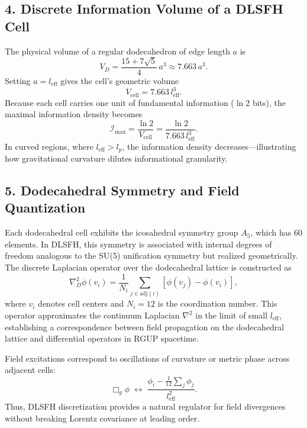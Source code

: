 \documentclass[11pt,oneside]{book}
\numberwithin{equation}{chapter}
\begin{document}
\subsection*{4. Discrete Information Volume of a DLSFH Cell}

The physical volume of a regular dodecahedron of edge length $a$ is
\begin{equation}
V_D = \frac{15+7\sqrt{5}}{4}\,a^3 \approx 7.663\,a^3.
\end{equation}
Setting $a = l_{\text{eff}}$ gives the cell’s geometric volume
\begin{equation}
V_{\text{cell}} = 7.663\,l_{\text{eff}}^3.
\end{equation}
Because each cell carries one unit of fundamental information ($\ln 2$ bits), the maximal information density becomes
\begin{equation}
\mathcal{I}_{\max} = 
\frac{\ln 2}{V_{\text{cell}}}
= \frac{\ln 2}{7.663\,l_{\text{eff}}^3}.
\end{equation}
In curved regions, where $l_{\text{eff}}>l_p$, the information density decreases—illustrating how gravitational curvature dilutes informational granularity.

\subsection*{5. Dodecahedral Symmetry and Field Quantization}

Each dodecahedral cell exhibits the icosahedral symmetry group $A_5$, which has 60 elements.  
In DLSFH, this symmetry is associated with internal degrees of freedom analogous to the SU(5) unification symmetry but realized geometrically.  
The discrete Laplacian operator over the dodecahedral lattice is constructed as
\begin{equation}
\nabla_D^2 \phi(v_i) = 
\frac{1}{N_i}\sum_{j\in \text{adj}(i)} [\phi(v_j) - \phi(v_i)],
\end{equation}
where $v_i$ denotes cell centers and $N_i=12$ is the coordination number.  
This operator approximates the continuum Laplacian $\nabla^2$ in the limit of small $l_{\text{eff}}$, establishing a correspondence between field propagation on the dodecahedral lattice and differential operators in RGUP spacetime.

Field excitations correspond to oscillations of curvature or metric phase across adjacent cells:
\begin{equation}
\Box_g \phi \;\longleftrightarrow\;
\frac{\phi_i - \frac{1}{12}\sum_{j}\phi_j}{l_{\text{eff}}^2}.
\end{equation}
Thus, DLSFH discretization provides a natural regulator for field divergences without breaking Lorentz covariance at leading order.
\end{document}
